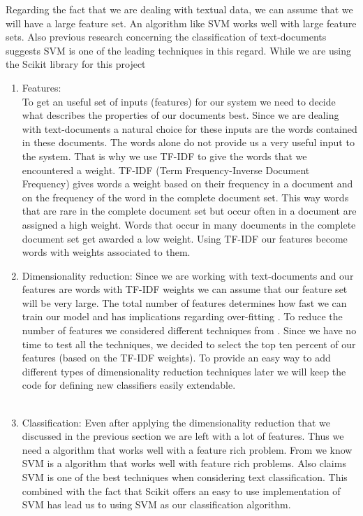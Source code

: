 Regarding the fact that we are dealing with textual data, we can assume that we will have a large feature set. An algorithm like SVM \cite{ml_text} works well with large feature sets\cite{MLCheatSheet}.
Also previous research concerning the classification of text-documents suggests SVM is one of the leading techniques in this regard\cite{ml_text}. While we are using the Scikit library for this project 


\begin{enumerate}
\item Features:\\ 
To get an useful set of inputs (features) for our system we need to decide what describes the properties of our documents best. Since we are dealing with text-documents a natural choice for these inputs are the words contained in these documents. 
The words alone do not provide us a very useful input to the system. That is why we use TF-IDF to give the words that we encountered a weight. TF-IDF (Term Frequency-Inverse Document Frequency) gives words a weight based on their frequency in a document and on the frequency of the word in the complete document set. This way words that are rare in the complete document set but occur often in a document are assigned a high weight. Words that occur in many documents in the complete document set get awarded a low weight\cite{ramos_tfidf}.
Using TF-IDF our features become words with weights associated to them.

\item Dimensionality reduction: 
Since we are working with text-documents and our features are words with TF-IDF weights we can assume that our feature set will be very large. The total number of features determines how fast we can train our model and has implications regarding over-fitting \cite{ml_text}. To reduce the number of features we considered different techniques from \cite{ml_text}. Since we have no time to test all the techniques, we decided to select the top ten percent of our features (based on the TF-IDF weights)\cite{yang1997}. To provide an easy way to add different types of dimensionality reduction techniques later we will keep the code for defining new classifiers easily extendable.
\\
\\
\item Classification:
Even after applying the dimensionality reduction that we discussed in the previous section we are left with a lot of features. Thus we need a algorithm that works well with a feature rich problem. From \cite{MLCheatSheet} we know SVM is a algorithm that works well with feature rich problems. Also \cite{ml_text} claims SVM is one of the best techniques when considering text classification. This combined with the fact that Scikit offers an easy to use implementation of SVM has lead us to using SVM as our classification algorithm.
\end{enumerate}


